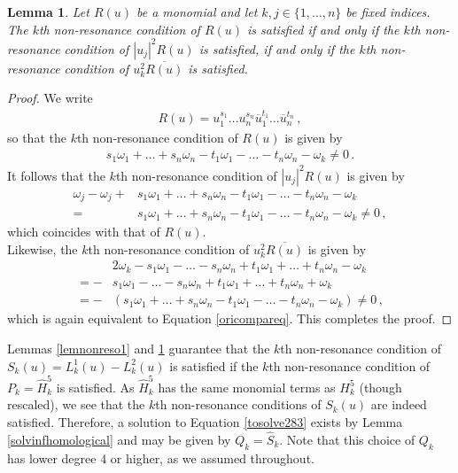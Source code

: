 \documentclass[12pt]{article}
\theoremstyle{plain}
\newtheorem{lem}[thr]{Lemma}
\theoremstyle{definition}
\theoremstyle{remark}
\theoremstyle{remark}
\begin{document}
\begin{lem}\label{lemnonreso2}
Let $R(u)$ be a monomial and let $k,j \in \{1, \dots, n\}$ be fixed indices. 
The $k$th non-resonance condition of $R(u)$ is satisfied if and only if the $k$th non-resonance condition of $|u_j|^2R(u)$ is satisfied, if and only if the $k$th non-resonance condition of $u_k^2\overline{R(u)}$ is satisfied.
\end{lem}

\begin{proof}
We write
\begin{align}
    R(u) = u_1^{s_1}\dots u_n^{s_n} \overline{u}_1^{t_1} \dots \overline{u}_n^{t_n}\, ,
\end{align}
so that the $k$th non-resonance condition of $R(u)$ is given by
\begin{align}\label{oricompareq}
   s_1\omega_1 + \dots + {s_n}\omega_n - t_1 \omega_1 - \dots - {t_n} \omega_n - \omega_k \not= 0\, .
\end{align}
It follows that the $k$th non-resonance condition of $|u_j|^2R(u)$ is given by
\begin{align}
  \omega_j - \omega_j + &s_1\omega_1 + \dots + {s_n}\omega_n - t_1 \omega_1 - \dots - {t_n} \omega_n - \omega_k \\ \nonumber
  = &s_1\omega_1 + \dots + {s_n}\omega_n - t_1 \omega_1 - \dots - {t_n} \omega_n - \omega_k\not= 0\, ,
\end{align}
which coincides with that of $R(u)$. \\
Likewise, the $k$th non-resonance condition of $u_k^2\overline{R(u)}$ is given by
\begin{align}
  &2\omega_k - s_1\omega_1 - \dots - {s_n}\omega_n + t_1 \omega_1 + \dots + {t_n} \omega_n - \omega_k \\ \nonumber
 =  - &s_1\omega_1 - \dots - {s_n}\omega_n + t_1 \omega_1 + \dots + {t_n} \omega_n + \omega_k \\ \nonumber
  =  - &(s_1\omega_1 + \dots + {s_n}\omega_n - t_1 \omega_1 - \dots - {t_n} \omega_n - \omega_k) \not= 0\, ,
\end{align}
which is again equivalent to Equation \eqref{oricompareq}. This completes the proof.
\end{proof}
Lemmas \ref{lemnonreso1} and \ref{lemnonreso2} guarantee that the $k$th non-resonance condition of $S_k(u) = L^1_k(u) - L^2_k(u)$ is satisfied if the $k$th non-resonance condition of $P_k = \widehat{H}^5_k$ is satisfied. As $\widehat{H}^5_k$ has the same monomial terms as $H^5_k$ (though rescaled), we see that the $k$th non-resonance conditions of $S_k(u)$ are indeed satisfied. Therefore, a solution to Equation \eqref{tosolve283} exists by  Lemma \eqref{solvinfhomological} and may be given by $Q_k = \widehat{S}_k$. Note that this choice of $Q_k$ has lower degree $4$ or higher, as we assumed throughout.
\end{document}
